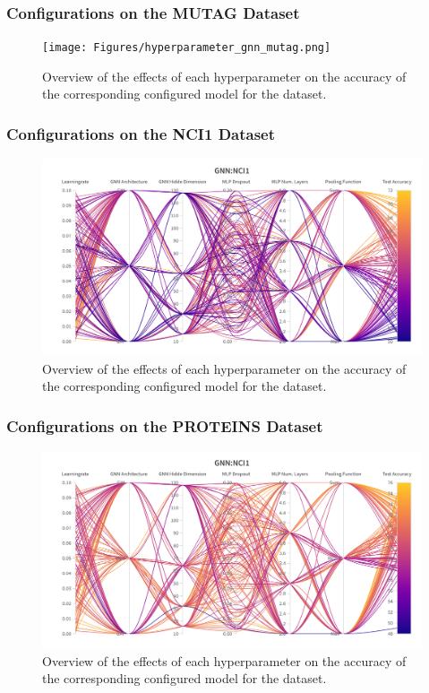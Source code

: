 \subsubsection{\gnn Configurations on the MUTAG Dataset}
\begin{figure}[H]
    \centering
    \texttt{[image: Figures/hyperparameter\_gnn\_mutag.png]}
    \caption{Overview of the effects of each hyperparameter on the accuracy of the corresponding configured \gnn model for the \mutag dataset.}
    \label{fig:wandb_gnn_mutag}
\end{figure}

\subsubsection{\gnn Configurations on the NCI1 Dataset}
\begin{figure}[H]
    \centering
    \includegraphics[width=\textwidth, trim={0 75 0 150}, clip]{Figures/hyperparameter_gnn_nci1.png}
    \caption{Overview of the effects of each hyperparameter on the accuracy of the corresponding configured \gnn model for the \nci dataset.}
    \label{fig:wandb_gnn_nci}
\end{figure}
\clearpage

\subsubsection{\gnn Configurations on the PROTEINS Dataset}
\begin{figure}[H]
    \centering
    \includegraphics[width=\textwidth, trim={0 75 0 150}, clip]{Figures/hyperparameter_gnn_proteins.png}
    \caption{Overview of the effects of each hyperparameter on the accuracy of the corresponding configured \gnn model for the \proteins dataset.}
    \label{fig:wandb_gnn_proteins}
\end{figure}

